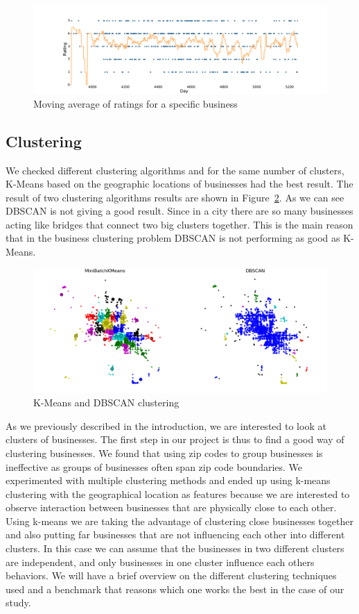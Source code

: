\documentclass{vldb}
\begin{document}
\begin{figure}[h]
\centering
\includegraphics[width=\linewidth]{moving_avg.pdf}
\caption{ Moving average of ratings for a specific business}
\label{fig:moving_average}
\end{figure}

\subsection{Clustering}
We checked different clustering algorithms and for the same number of clusters, K-Means based on the geographic locations of businesses had the best result. The result of two clustering algorithms results are shown in Figure~\ref{fig:clusters}.  As we can see DBSCAN is not giving a good result. Since in a city there are so many businesses acting like bridges that connect two big clusters together. This is the main reason that in the business clustering problem DBSCAN is not performing as good as K-Means.

\begin{figure}[h]
\centering
\includegraphics[width=\columnwidth]{clusters.png}
\caption{ K-Means and DBSCAN clustering}
\label{fig:clusters}
\end{figure}

As we previously described in the introduction, we are interested to look at clusters of businesses.
The first step in our project is thus to find a good way of clustering businesses.
We found that using zip codes to group businesses is ineffective as groups of businesses often span zip code boundaries.
We experimented with multiple clustering methods and ended up using k-means clustering with the geographical location as features because we are interested to observe interaction between businesses that are physically close to each other. Using k-means we are taking the advantage of clustering close businesses together and also putting far businesses that are not influencing each other into different clusters. In this case we can assume that the businesses in two different clusters are independent, and only businesses in one cluster influence each others behaviors. We will have a brief overview on the different clustering techniques used and a benchmark that reasons which one works the best in the case of our study.
\end{document}
